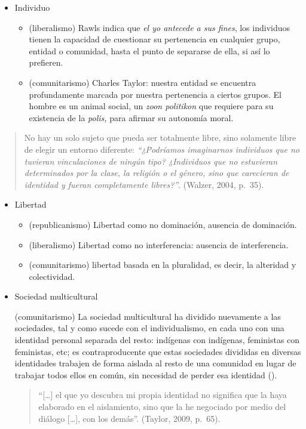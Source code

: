 \documentclass[
  letterpaper,
  DIV=11,
  numbers=noendperiod]{scrreprt}
\begin{document}
\begin{itemize}
\item
  Individuo

  \begin{itemize}
  \item
    (liberalismo) Rawls indica que \emph{el yo antecede a sus fines},
    los individuos tienen la capacidad de cuestionar su pertenencia en
    cualquier grupo, entidad o comunidad, hasta el punto de separarse de
    ella, si así lo prefieren.
  \item
    (comunitarismo) Charles Taylor: nuestra entidad se encuentra
    profundamente marcada por nuestra pertenencia a ciertos grupos. El
    hombre es un animal social, un \emph{zoon politikon} que requiere
    para su existencia de la \emph{polis,} para afirmar su autonomía
    moral.
  \end{itemize}
\end{itemize}

\begin{quote}
No hay un solo sujeto que pueda ser totalmente libre, sino solamente
libre de elegir un entorno diferente: \emph{``¿Podríamos imaginarnos
individuos que no tuvieran vinculaciones de ningún tipo? ¿Individuos que
no estuvieran determinados por la clase, la religión o el género, sino
que carecieran de identidad y fueran completamente libres?''}. (Walzer,
2004, p.~35).
\end{quote}

\begin{itemize}
\item
  Libertad

  \begin{itemize}
  \item
    (republicanismo) Libertad como no dominación, ausencia de
    dominación.
  \item
    (liberalismo) Libertad como no interferencia: ausencia de
    interferencia.
  \item
    (comunitarismo) libertad basada en la pluralidad, es decir, la
    alteridad y colectividad.
  \end{itemize}
\item
  Sociedad multicultural

  (comunitarismo) La sociedad multicultural ha dividido nuevamente a las
  sociedades, tal y como sucede con el individualismo, en cada uno con
  una identidad personal separada del resto: indígenas con indígenas,
  feministas con feministas, etc; es contraproducente que estas
  sociedades divididas en diversas identidades trabajen de forma aislada
  al resto de una comunidad en lugar de trabajar todos ellos en común,
  sin necesidad de perder esa identidad
  ().

  \begin{quote}
  ``{[}\ldots{]} el que yo descubra mi propia identidad no significa que
  la haya elaborado en el aislamiento, sino que la he negociado por
  medio del diálogo {[}\ldots{]}, con los demás''. (Taylor, 2009,
  p.~65).
  \end{quote}
\end{itemize}
\end{document}
